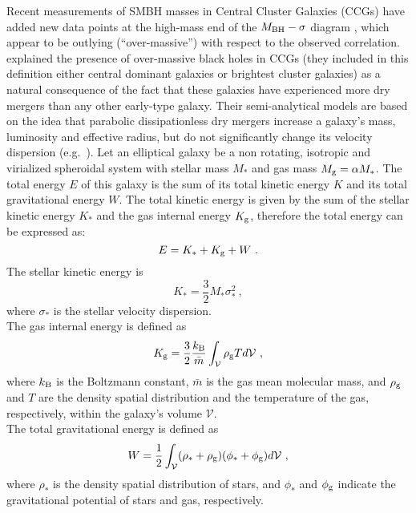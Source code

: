 Recent measurements of SMBH masses in Central Cluster Galaxies (CCGs)
have added new data points at the high-mass end of the 
$M_{\rm BH} - \sigma$ diagram \citep{mcconnell2011,mcconnell2012}, 
which appear to be outlying (``over-massive'') with respect to the observed correlation. 
\citet{volontericiotti2013} explained the presence of over-massive black holes in CCGs 
(they included in this definition either central dominant galaxies or brightest cluster galaxies) 
as a natural consequence of the fact that these galaxies have experienced more dry mergers 
than any other early-type galaxy. 
Their semi-analytical models are based on the idea that parabolic dissipationless dry mergers 
increase a galaxy's mass, luminosity and effective radius, 
but do not significantly change its velocity dispersion (e.g.~\citealt{ciotti2007}). 
Let an elliptical galaxy be a non rotating, isotropic and virialized spheroidal system 
with stellar mass $M_{*}$ and gas mass $M_{\rm g} = \alpha M_{*}$. 
The total energy $E$ of this galaxy is the sum of its total kinetic energy $K$ and its total gravitational energy $W$. 
The total kinetic energy is given by the sum of the stellar kinetic energy $K_*$ and the gas internal energy $K_{\rm g}$, 
therefore the total energy can be expressed as:
\begin{equation}
E = K_* + K_{\rm g} + W \ .
\end{equation}
The stellar kinetic energy is 
\begin{equation}
K_* = \frac{3}{2} M_* \sigma_*^2 \ ,
\end{equation}
where $\sigma_*$ is the stellar velocity dispersion. \\
The gas internal energy is defined as 
\begin{equation}
K_{\rm g} = \frac{3}{2} \frac{k_{\rm B}}{\bar{m} } \int_{\mathcal{V}} \rho_{\rm g} T d\mathcal{V} \ ,
\end{equation}
where $k_{\rm B}$ is the Boltzmann constant, $\bar{m}$ is the gas mean molecular mass, and 
$\rho_{\rm g}$ and $T$ are the density spatial distribution and the temperature of the gas, respectively, 
within the galaxy's volume $\mathcal{V}$. \\
The total gravitational energy is defined as 
\begin{equation}
W = \frac{1}{2} \int_{\mathcal{V}} (\rho_* + \rho_{\rm g}) (\phi_* + \phi_{\rm g}) d\mathcal{V} \ , 
\end{equation}
where $\rho_*$ is the density spatial distribution of stars, 
and $\phi_*$ and $\phi_{\rm g}$ indicate the gravitational potential of stars and gas, respectively. \\
